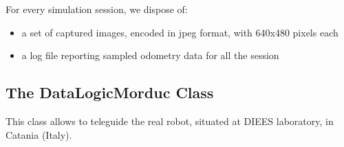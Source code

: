 For every simulation session, we dispose of:

\begin{itemize}
  \item a set of captured images, encoded in jpeg format,
    with 640x480 pixels each
  \item a log file reporting sampled odometry data
    for all the session
\end{itemize}


\subsection{The DataLogicMorduc Class}
\label{concr:idatalogic:datalogicmorduc}

This class allows \framework{} to teleguide the real \morduc{}
robot, situated at DIEES laboratory, in Catania (Italy).
